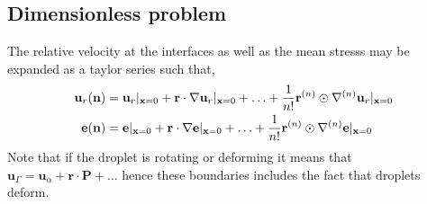 \subsection*{Dimensionless problem}
The relative velocity at the interfaces as well as the mean stresss may be expanded as a taylor series such that, 
\begin{align*}
    \textbf{u}_r(\textbf{n}) 
    &=  \textbf{u}_r|_{\textbf{x}=0}
    +  \textbf{r} \cdot  \mathbf{\nabla}\textbf{u}_r|_{\textbf{x}=0}
    + \ldots
    +  \frac{1}{n!}\textbf{r}^{(n)} \odot \mathbf{\nabla}^{(n)}\textbf{u}_r|_{\textbf{x}=0}
    \\
     \textbf{e}(\textbf{n}) 
    &=   \textbf{e}|_{\textbf{x}=0}
    + \textbf{r} \cdot  \mathbf{\nabla} \textbf{e}|_{\textbf{x}=0}
    + \ldots
    + \frac{1}{n!}\textbf{r}^{(n)} \odot  \mathbf{\nabla}^{(n)} \textbf{e}|_{\textbf{x}=0}
\end{align*}
Note that if the droplet is rotating or deforming it means that $\textbf{u}_\Gamma = \textbf{u}_\alpha + \textbf{r}\cdot \textbf{P}+ \ldots$ hence these boundaries includes the fact that droplets deform. 


